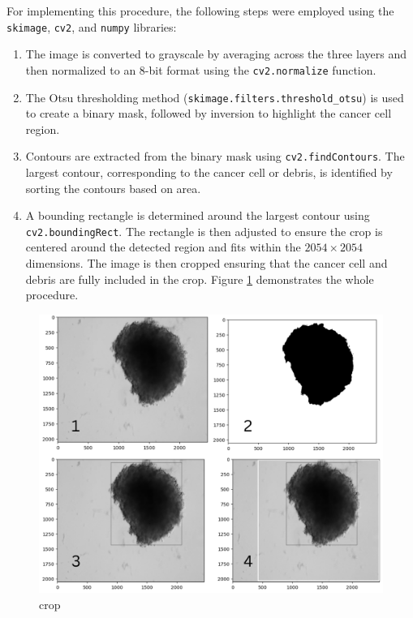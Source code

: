 \begin{enumerate}
For implementing this procedure, the following steps were employed using the \texttt{skimage}, \texttt{cv2}, and \texttt{numpy} libraries:
\begin{enumerate}
    \item The image is converted to grayscale by averaging across the three layers and then normalized to an 8-bit format using the \texttt{cv2.normalize} function.
    \item The Otsu thresholding method (\texttt{skimage.filters.threshold\_otsu}) is used to create a binary mask, followed by inversion to highlight the cancer cell region.
    \item Contours are extracted from the binary mask using \texttt{cv2.findContours}. The largest contour, corresponding to the cancer cell or debris, is identified by sorting the contours based on area.
    \item A bounding rectangle is determined around the largest contour using \texttt{cv2.boundingRect}. The rectangle is then adjusted to ensure the crop is 
    centered around the detected region and fits within the  \(2054 \times 2054\) dimensions. The image is then cropped ensuring that the cancer cell and debris 
    are fully included in the crop. Figure \ref{fig:crop} demonstrates the whole procedure.
\end{enumerate}

\begin{figure}[H]
  \centering
  \includegraphics[scale=0.46]{figures/crop.png} 
  \caption{crop}
  \label{fig:crop}
\end{figure}


\end{enumerate}
